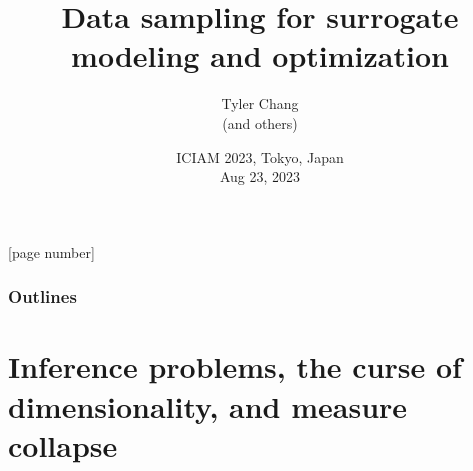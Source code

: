 \documentclass[aspectratio=169]{beamer}
\title{Data sampling for surrogate modeling and optimization}
\author{Tyler Chang\\
(and others)}
\date{ICIAM 2023, Tokyo, Japan\\
Aug 23, 2023}
\institute{Argonne National Laboratory}
\begin{document}
{
\frame{\titlepage}
}

[page number]{}

\begin{frame}
  \frametitle{Outlines}
  \tableofcontents
\end{frame}

\section{Inference problems, the curse of dimensionality, and measure collapse}
\end{document}
